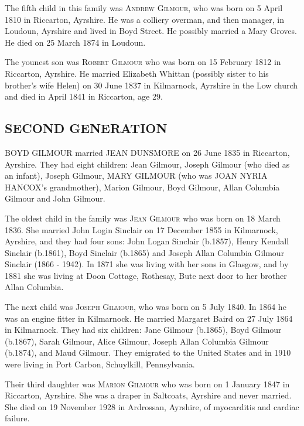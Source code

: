 The fifth child in this family was \textsc{Andrew Gilmour}, who was born on 5 April 1810 in Riccarton, Ayrshire. He was a colliery overman, and then manager, in Loudoun, Ayrshire and lived in Boyd Street. He possibly married a Mary Groves.  He died 
on 25 March 1874 in Loudoun.

The younest son was \textsc{Robert Gilmour}  who was born on 15 February 1812 in Riccarton, Ayrshire. He married Elizabeth Whittan (possibly sister to his brother's wife Helen) on 30 June 1837 in Kilmarnock, Ayrshire in the Low church and died in April 1841 in Riccarton, age 29.

\subsection{SECOND GENERATION}

\uppercase{Boyd Gilmour} married \uppercase{Jean Dunsmore} on 26 June 1835 in Riccarton, Ayrshire.  They had eight children:  Jean Gilmour, Joseph Gilmour (who died as an infant), Joseph Gilmour, \uppercase{Mary Gilmour} (who was \uppercase{Joan Nyria Hancox}'s grandmother), Marion Gilmour, Boyd Gilmour, Allan Columbia Gilmour and John Gilmour. 

The oldest child in the family was \textsc{Jean Gilmour} who was born on 18 March 1836. She married John Login Sinclair on 17 December 1855 in Kilmarnock, Ayrshire, and they had four sons: John Logan Sinclair (b.1857), Henry Kendall Sinclair (b.1861), 
Boyd Sinclair (b.1865) and Joseph Allan Columbia Gilmour Sinclair (1866 - 1942).  In 1871 she was living with her sons in Glasgow, and by 1881 she was living at Doon Cottage, Rothesay, Bute next door to her brother Allan Columbia.

The next child was \textsc{Joseph Gilmour}, who was born on 5 July 1840. In 1864 he was an engine fitter in Kilmarnock. He married Margaret Baird on 27 July 1864 in Kilmarnock. They had six children: Jane Gilmour (b.1865), Boyd Gilmour (b.1867), Sarah Gilmour, Alice Gilmour, Joseph Allan Columbia Gilmour (b.1874), and Maud Gilmour. They emigrated to the United States and in 1910 were living in Port Carbon, Schuylkill, Pennsylvania.

Their third daughter was \textsc{Marion Gilmour} who was born on 1 January 1847 in Riccarton, Ayrshire. She was a draper in Saltcoats, Ayrshire and never married. She died on 19 November 1928 in Ardrossan, Ayrshire, of myocarditis and cardiac failure.


